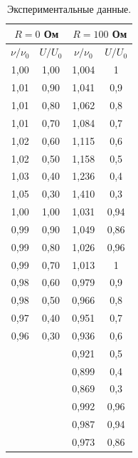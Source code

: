 \documentclass[a4paper,12pt]{article} %
\begin{document}
		\begin{table}[H]
			\caption{Экспериментальные данные.}
			\label{table:experiment}
			\begin{tabular}{|c|c|c|c|}
				\hline
				\multicolumn{2}{|c|}{$R = 0$ Ом} & \multicolumn{2}{c|}{$R = 100$ Ом} \\ \hline
				$\nu/\nu_0$       & $U/U_0$      & $\nu/\nu_0$       & $U/U_0$       \\ \hline
				1,00              & 1,00         & 1,004             & 1             \\ \hline
				1,01              & 0,90         & 1,041             & 0,9           \\ \hline
				1,01              & 0,80         & 1,062             & 0,8           \\ \hline
				1,01              & 0,70         & 1,084             & 0,7           \\ \hline
				1,02              & 0,60         & 1,115             & 0,6           \\ \hline
				1,02              & 0,50         & 1,158             & 0,5           \\ \hline
				1,03              & 0,40         & 1,236             & 0,4           \\ \hline
				1,05              & 0,30         & 1,410             & 0,3           \\ \hline
				1,00              & 1,00         & 1,031             & 0,94          \\ \hline
				0,99              & 0,90         & 1,049             & 0,86          \\ \hline
				0,99              & 0,80         & 1,026             & 0,96          \\ \hline
				0,99              & 0,70         & 1,013             & 1             \\ \hline
				0,98              & 0,60         & 0,979             & 0,9           \\ \hline
				0,98              & 0,50         & 0,966             & 0,8           \\ \hline
				0,97              & 0,40         & 0,951             & 0,7           \\ \hline
				0,96              & 0,30         & 0,936             & 0,6           \\ \hline
				&              & 0,921             & 0,5           \\ \hline
				&              & 0,899             & 0,4           \\ \hline
				&              & 0,869             & 0,3           \\ \hline
				&              & 0,992             & 0,96          \\ \hline
				&              & 0,987             & 0,94          \\ \hline
				&              & 0,973             & 0,86          \\ \hline
			\end{tabular}
		\end{table}
		
\end{document}
